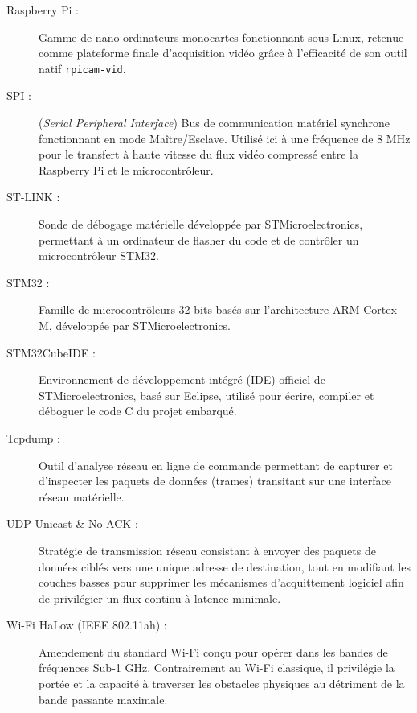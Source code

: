 \begin{description}
    \item[Raspberry Pi :] Gamme de nano-ordinateurs monocartes fonctionnant sous Linux, retenue comme plateforme 
    finale d'acquisition vidéo grâce à l'efficacité de son outil natif \texttt{rpicam-vid}.
    
    \item[SPI :] (\textit{Serial Peripheral Interface}) Bus de communication matériel synchrone fonctionnant en 
    mode Maître/Esclave. Utilisé ici à une fréquence de 8 MHz pour le transfert à haute vitesse du flux vidéo 
    compressé entre la Raspberry Pi et le microcontrôleur.
    
    \item[ST-LINK :] Sonde de débogage matérielle développée par STMicroelectronics, permettant à un ordinateur 
    de flasher du code et de contrôler un microcontrôleur STM32.
    
    \item[STM32 :] Famille de microcontrôleurs 32 bits basés sur l'architecture ARM Cortex-M, développée par 
    STMicroelectronics.
    
    \item[STM32CubeIDE :] Environnement de développement intégré (IDE) officiel de STMicroelectronics, basé sur 
    Eclipse, utilisé pour écrire, compiler et déboguer le code C du projet embarqué.
    
    \item[Tcpdump :] Outil d'analyse réseau en ligne de commande permettant de capturer et d'inspecter les 
    paquets de données (trames) transitant sur une interface réseau matérielle.
    
    \item[UDP Unicast \& No-ACK :] Stratégie de transmission réseau consistant à envoyer des paquets de données 
    ciblés vers une unique adresse de destination, tout en modifiant les couches basses pour supprimer les 
    mécanismes d'acquittement logiciel afin de privilégier un flux continu à latence minimale.
    
    \item[Wi-Fi HaLow (IEEE 802.11ah) :] Amendement du standard Wi-Fi conçu pour opérer dans les bandes de 
    fréquences Sub-1 GHz. Contrairement au Wi-Fi classique, il privilégie la portée et la capacité à traverser 
    les obstacles physiques au détriment de la bande passante maximale.
\end{description}

\vspace{0.5cm}